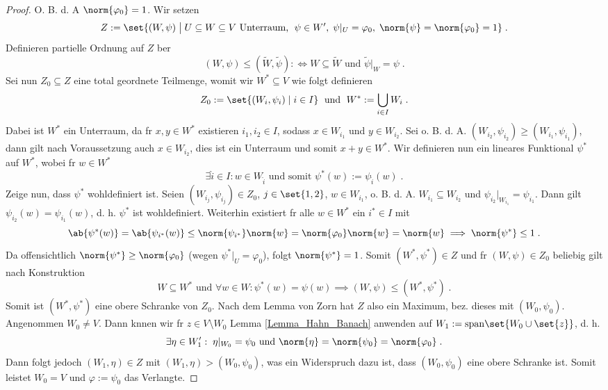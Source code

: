 \begin{proof}
	O. B. d. A \(\norm{\varphi_0} = 1\). Wir setzen
	\[Z := \set{(W,\psi)\;\big\vert\; U\subseteq W \subseteq V \text{ Unterraum, }\;\psi \in W',\; \psi\vert_U = \varphi_0,\; \norm{\psi} = \norm{\varphi_0} = 1}\;.\]
	Definieren partielle Ordnung auf $Z$ \us ber
	\[(W,\psi) \leq (\tilde W, \tilde \psi) : \iff W \subseteq \tilde W \text{ und } \tilde\psi \vert_W = \psi\;.\]
	Sei nun $Z_0\subseteq Z$ eine total geordnete Teilmenge, womit wir $W^*\subseteq V$ wie folgt definieren
	\[Z_0 := \set{(W_i,\psi_i)\;\vert\; i \in I}\;\text{ und }\; W^* := \bigcup_{i\in I} W_i\;.\]
	Dabei ist $W^*$ ein Unterraum, da f\us r \(x,y \in W^*\) existieren \(i_1, i_2 \in I\), sodass \(x \in W_{i_1}\) und \(y\in W_{i_2}\). Sei o. B. d. A. \((W_{i_2}, \psi_{i_2}) \geq (W_{i_1}, \psi_{i_1})\), dann gilt nach Voraussetzung auch \(x\in W_{i_2}\), dies ist ein Unterraum und somit \(x+y \in W^*\). Wir definieren nun ein lineares Funktional \(\psi^*\) auf \(W^*\), wobei f\us r \(w \in W^*\)
	\[ \exists \hat i\in I: w \in W_{\hat i} \text{ und somit }\psi^*(w) := \psi_{\hat i}(w)\;.\]
	Zeige nun, dass \(\psi^*\) wohldefiniert ist. Seien \((W_{i_j}, \psi_{i_j})\in Z_0\), \(j\in\set{1,2}\), \(w\in W_{i_1}\), o. B. d. A. \(W_{i_1}\subseteq W_{i_2}\) und \(\psi_{i_2}\vert_{W_{i_1}} = \psi_{i_1}\). Dann gilt \(\psi_{i_2}(w) = \psi_{i_1}(w)\), d. h. 
	\(\psi^*\) ist wohldefiniert. Weiterhin existiert f\us r alle \(w\in W^*\) ein \(i^* \in I \) mit 
	\[\ab{\psi^*(w)} = \ab{\psi_{i^*}(w)} \leq \norm{\psi_{i^*}}\norm{w} = \norm{\varphi_0} \norm{w} = \norm{w} \implies \norm{\psi^*} \leq 1\;.\]
	Da offensichtlich \(\norm{\psi^*} \geq \norm{\varphi_0}\) (wegen \(\psi^*\vert_U = \varphi_0\)), folgt \(\norm{\psi^*} = 1\).
	Somit \((W^*, \psi^*)\in Z\) und f\us r \((W,\psi) \in Z_0\) beliebig gilt nach Konstruktion 
	\[W \subseteq W^* \text{ und } \forall w \in W: \psi^*(w) = \psi(w) \implies (W,\psi) \leq (W^*, \psi^*)\;.\]
	Somit ist \((W^*, \psi^*)\) eine obere Schranke von $Z_0$. Nach dem Lemma von Zorn hat $Z$ also ein Maximum, bez. dieses mit \((W_0,\psi_0)\). Angenommen \(W_0 \neq V\). Dann k\os nnen wir f\us r \(z \in V \setminus W_0\) Lemma \ref{Lemma_Hahn_Banach} anwenden auf \(W_1:= \text{span}\set{W_0\cup\set{z}}\), d. h.
	\[\exists \eta \in W_1' :\; \eta\vert_{W_0} = \psi_0 \text{ und } \norm{\eta} = \norm{\psi_0} = \norm{\varphi_0}\;.\]
	Dann folgt jedoch \((W_1,\eta) \in Z\) mit \((W_1,\eta) > (W_0,\psi_0)\), was ein Widerspruch dazu ist, dass \((W_0, \psi_0)\) eine obere Schranke ist. Somit leistet \(W_0 = V\) und \(\varphi:= \psi_0\) das Verlangte.
\end{proof}
	
